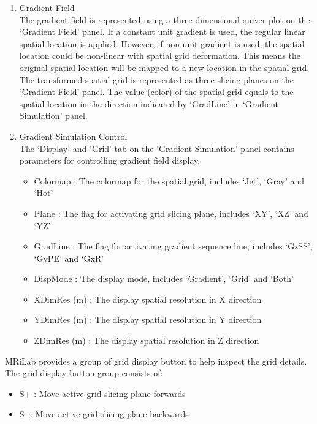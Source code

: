 \documentclass{book}%
\begin{document}
\begin{enumerate}
	\item Gradient Field \\
	
The gradient field is represented using a three-dimensional quiver plot on the `Gradient Field' panel. If a constant unit gradient is used, the regular linear spatial location is applied. However, if non-unit gradient is used, the spatial location could be non-linear with spatial grid deformation. This means the original spatial location will be mapped to a new location in the spatial grid. The transformed spatial grid is represented as three slicing planes on the `Gradient Field' panel. The value (color) of the spatial grid equals to the spatial location in the direction indicated by `GradLine' in `Gradient Simulation' panel.
	
	\item Gradient Simulation Control \\
	
The `Display' and `Grid' tab on the `Gradient Simulation' panel contains parameters for controlling gradient field display.

\begin{itemize}
	\item Colormap : The colormap for the spatial grid, includes `Jet', `Gray' and `Hot'
	\item Plane : The flag for activating grid slicing plane, includes `XY', `XZ' and `YZ'
	\item GradLine : The flag for activating gradient sequence line, includes `GzSS', `GyPE' and `GxR'
	\item DispMode : The display mode, includes `Gradient', `Grid' and `Both'
	\item XDimRes (m) : The display spatial resolution in X direction
	\item YDimRes (m) : The display spatial resolution in Y direction
	\item ZDimRes (m) : The display spatial resolution in Z direction
\end{itemize}

\end{enumerate}

MRiLab provides a group of grid display button to help inspect the grid details. The grid display button group consists of:

\begin{itemize}
	\item S+ : Move active grid slicing plane forwards
	\item S- : Move active grid slicing plane backwards
\end{itemize}
\end{document}
